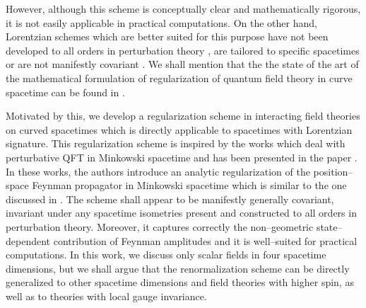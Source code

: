 \documentclass[11pt]{book}
\theoremstyle{break}
\begin{document}
However, although this scheme is conceptually clear and mathematically rigorous, it is not easily applicable in practical computations. On the other hand, Lorentzian schemes which are better suited for this purpose have not been developed to all orders in perturbation theory \cite{CHL_1995,PRANGE_1999}, are tailored to specific spacetimes \cite{HOLLANDS_2010} or are not manifestly covariant \cite{BCK_2010}. We shall mention that the the state of the art of the mathematical formulation of regularization of quantum field theory in curve spacetime can be found in \cite{DANG_2013}.\par%


\bigskip


Motivated by this, we develop a regularization scheme in interacting field theories on curved spacetimes which is directly applicable to spacetimes with Lorentzian signature. This regularization scheme is inspired by the works \cite{KELLER_2010,DFKR_2014} which deal with perturbative QFT in Minkowski spacetime and has been presented in the paper \cite{GHP_2015}.  In these works, the authors introduce an analytic regularization of the position--space Feynman propagator in Minkowski spacetime which is similar to the one discussed in \cite{BG_1972}. The scheme shall appear to be manifestly generally covariant, invariant under any spacetime isometries present and constructed to all orders in perturbation theory. Moreover, it captures correctly the non--geometric state--dependent contribution of Feynman amplitudes and it is well--suited for practical computations. In this work, we discuss only scalar fields in four spacetime dimensions, but we shall argue that the renormalization scheme can be directly generalized to other spacetime dimensions and field theories with higher spin, as well as to theories with local gauge invariance.\par%
\end{document}
